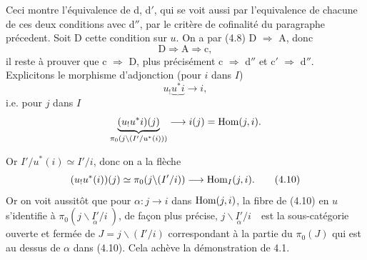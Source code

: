 \dgrchunkbegin

Ceci montre l'équivalence de d, d$'$, qui se voit aussi par l'equivalence de chacune de ces deux conditions avec d$''$, par le critère de cofinalité du paragraphe précedent. Soit D cette condition sur $u$. On a par (4.8) D $\Longrightarrow$ A, donc %
\[
\mathrm{D} \Longrightarrow \mathrm{A} \Longrightarrow \mathrm{c},
\]
il reste à prouver que c $\Longrightarrow$ D, plus précisément c $\Longrightarrow$ d$''$ et c$'$ $\Longrightarrow$ d$''$. Explicitons le morphisme d'adjonction (pour $i$ dans $I$)
\[
u_!\underbrace{u^*i} \longrightarrow i,
\]
i.e. pour $j$ dans $I$
\[
\underbrace{(u_!u^*i)(j)}_{\pi_0(j\backslash(I'/u^*(i)))} \longrightarrow i(j) = \operatorname{Hom}(j,i).
\]

Or $I'/u^*(i) \simeq I'/i$, donc on a la flèche
\[
(u_!u^*(i))(j) \simeq \pi_0(j\backslash(I'/i)) \longrightarrow \Hom_I(j,i). \tag*{(4.10)}
\]
Or on voit aussitôt que pour $\alpha : j \longrightarrow i$ dans $\operatorname{Hom}(j,i)$, la fibre de (4.10) en $u$ s'identifie à $\pi_0(j\backslash\underset{\alpha}{I'}/i\ )$, de façon plus précise, $j\backslash\underset{\alpha}{I'}/i$\ \ est la sous-catégorie ouverte et fermée de $J = j\backslash(I'/i)$ correspondant à la partie du $\pi_0(J)$ qui est au dessus de $\alpha$ dans (4.10). Cela achève la démonstration de 4.1.

